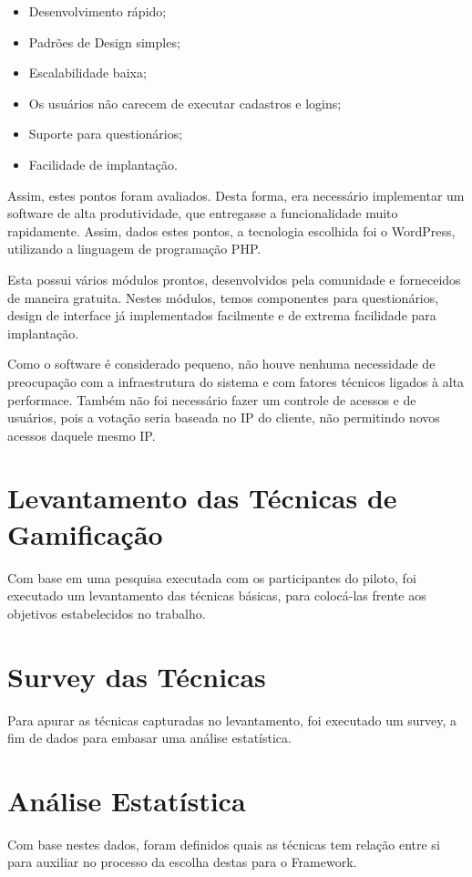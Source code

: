 \begin{itemize}
    \item Desenvolvimento rápido;
    \item Padrões de Design simples;
    \item Escalabilidade baixa;
    \item Os usuários não carecem de executar cadastros e logins;
    \item Suporte para questionários;
    \item Facilidade de implantação.
\end{itemize}

Assim, estes pontos foram avaliados. Desta forma, era necessário implementar um software
de alta produtividade, que entregasse a funcionalidade muito rapidamente. Assim, dados estes
pontos, a tecnologia escolhida foi o WordPress, utilizando a linguagem de programação PHP.

Esta possui vários módulos prontos, desenvolvidos pela comunidade e forneceidos de maneira
gratuita. Nestes módulos, temos componentes para questionários, design de interface já
implementados facilmente e de extrema facilidade para implantação.

Como o software é considerado pequeno, não houve nenhuma necessidade de preocupação com a 
infraestrutura  do sistema e com fatores técnicos ligados à alta performace. Também não foi
necessário fazer um controle de acessos e de usuários, pois a votação seria baseada no IP
do cliente, não permitindo novos acessos daquele mesmo IP.

\section{Levantamento das Técnicas de Gamificação}
\label{sec:gamifição}
Com base em uma pesquisa executada com os participantes do piloto, foi executado um levantamento das
técnicas básicas, para colocá-las frente aos objetivos estabelecidos no trabalho.

\section{Survey das Técnicas}
\label{sec:gamifição}
Para apurar as técnicas capturadas no levantamento, foi executado um survey, a fim de dados para
embasar uma análise estatística.

\section{Análise Estatística}
\label{sec:gamifição}
Com base nestes dados, foram definidos quais as técnicas tem relação entre si para auxiliar no processo
da escolha destas para o Framework.

